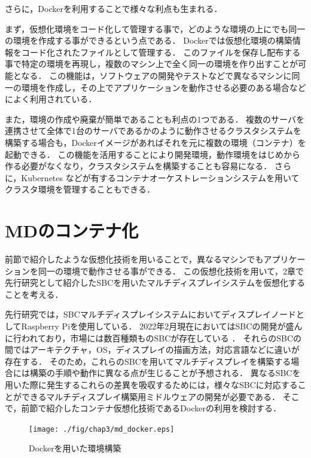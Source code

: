 さらに，Dockerを利用することで様々な利点も生まれる．

まず，仮想化環境をコード化して管理する事で，どのような環境の上にでも同一の環境を作成する事ができるという点である．
Dockerでは仮想化環境の構築情報をコード化されたファイルとして管理する．
このファイルを保存し配布する事で特定の環境を再現し，複数のマシン上で全く同一の環境を作り出すことが可能となる．
この機能は，ソフトウェアの開発やテストなどで異なるマシンに同一の環境を作成し，その上でアプリケーションを動作させる必要のある場合などによく利用されている．

また，環境の作成や廃棄が簡単であることも利点の1つである．
複数のサーバを連携させて全体で1台のサーバであるかのように動作させるクラスタシステムを構築する場合も，Dockerイメージがあればそれを元に複数の環境（コンテナ）を起動できる．
この機能を活用することにより開発環境，動作環境をはじめから作る必要がなくなり，クラスタシステムを構築することも容易になる．
さらに，Kubernetes \cite{k8s}などが有するコンテナオーケストレーションシステムを用いてクラスタ環境を管理することもできる．

\section{MDのコンテナ化}
前節で紹介したような仮想化技術を用いることで，異なるマシンでもアプリケーションを同一の環境で動作させる事ができる．
この仮想化技術を用いて，2章で先行研究として紹介したSBCを用いたマルチディスプレイシステムを仮想化することを考える．

先行研究では，SBCマルチディスプレイシステムにおいてディスプレイノードとしてRaspberry Piを使用している．
2022年2月現在においてはSBCの開発が盛んに行われており，市場には数百種類ものSBCが存在している \cite{hackerbords}．
それらのSBCの間ではアーキテクチャ，OS，ディスプレイの描画方法，対応言語などに違いが存在する．
そのため，これらのSBCを用いてマルチディスプレイを構築する場合には構築の手順や動作に異なる点が生じることが予想される．
異なるSBCを用いた際に発生するこれらの差異を吸収するためには，様々なSBCに対応することができるマルチディスプレイ構築用ミドルウェアの開発が必要である．
そこで，前節で紹介したコンテナ仮想化技術であるDockerの利用を検討する．

\begin{figure}[H]
    \hspace*{\fill}
    \texttt{[image: ./fig/chap3/md\_docker.eps]}
    \hspace*{\fill}
    \caption{Dockerを用いた環境構築}
    \label{docker_usage}
\end{figure}

